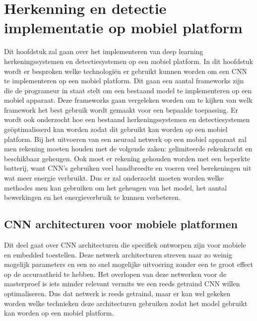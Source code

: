  
\chapter{Herkenning en detectie implementatie op mobiel platform}
Dit hoofdstuk zal gaan over het implementeren van deep learning herkeningssystemen en detectiesystemen op een mobiel platform.
In dit hoofdstuk wordt er besproken welke technologi\"en er gebruikt kunnen worden om een CNN te implementeren op een mobiel platform.
Dit gaan een aantal frameworks zijn die de programeur in staat stelt om een bestaand model te implementeren op een mobiel apparaat.
Deze frameworks gaan vergeleken worden om te kijken van welk framework het best gebruik wordt gemaakt voor een bepaalde toepassing.
Er wordt ook onderzocht hoe een bestaand herkeningssystemen en detectiesystemen ge\"optimalisserd kan worden zodat dit gebruikt kan worden op een mobiel platform.
Bij het uitvoeren van een neuraal netwerk op een mobiel apparaat zal men rekening moeten houden met de volgende zaken: 
gelimiteerde rekenkracht en beschikbaar geheugen.
Ook moet er rekening gehouden worden met een beperkte batterij, want CNN's gebruiken veel bandbreedte en voeren veel berekeningen uit wat meer energie verbruikt.
Dus er zal onderzocht moeten worden welke methodes men kan gebruiken om het geheugen van het model, het aantal bewerkingen en het energieverbruik te kunnen verbeteren.

\section{CNN architecturen voor mobiele platformen}
Dit deel gaat over CNN architecturen die specifiek ontworpen zijn voor mobiele en embedded toestellen.
Deze netwerk architecturen streven naar zo weinig mogelijk parameters en een zo snel mogelijke uitvoering zonder een te groot effect op de accuraatheid te hebben.
Het overlopen van deze netwerken voor de masterproef is iets minder relevant vermits we een reeds getraind CNN willen optimaliseren.
Dus dat netwerk is reeds getraind, maar er kan wel gekeken worden welke technieken deze architecturen gebruiken zodat het model gebruikt kan worden op een mobiel platform.

